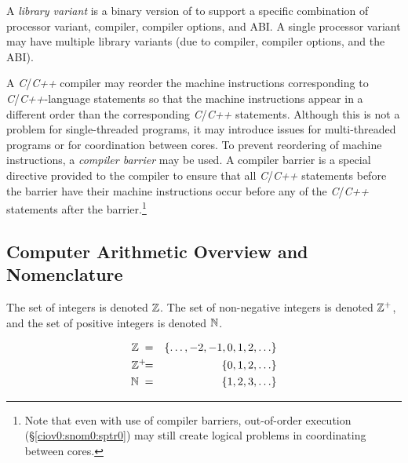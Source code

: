 A \emph{library variant} is a binary 
version of \emph{\productbasenameshort{}} to support a 
specific combination of processor variant, compiler, 
compiler options, and ABI\@.  A single processor variant may 
have multiple library variants (due to compiler, compiler 
options, and the ABI).  

A \emph{C}/\emph{C++} compiler may reorder the machine 
instructions corresponding to \emph{C}/\emph{C++}-language 
statements so that the machine instructions appear in a 
different order than the corresponding \emph{C}/\emph{C++} 
statements.  Although this is not a problem for 
single-threaded programs, it may introduce issues for 
multi-threaded programs or for coordination between cores.  
To prevent reordering of machine instructions, a 
\emph{compiler barrier} may be used.  
A compiler barrier is a special directive provided to the 
compiler to ensure that all \emph{C}/\emph{C++} statements 
before the barrier have their machine instructions occur 
before any of the \emph{C}/\emph{C++} statements after the 
barrier.\footnote{Note that even with use of compiler 
barriers, out-of-order execution 
(\S{}\ref{ciov0:snom0:sptr0}) may still create logical 
problems in coordinating between cores.} 



\subsection{Computer Arithmetic Overview and Nomenclature}
\label{cldd0:snom0:scan0}

The set of integers is denoted 
${\mathbb{Z}}{}$\@.  The set of 
non-negative integers is denoted 
${\mathbb{Z}^+}{}$, and 
the set of positive integers is denoted 
${\mathbb{N}}{}$.  

\begin{eqnarray}
\label{eq:ciov0:snom0:scan0:01}
{\mathbb{Z}}{}   \;    & = & \{ \ldots , -2, -1, 0, 1, 2, \ldots \} \\
\label{eq:ciov0:snom0:scan0:02}
{\mathbb{Z}^+}{} \!\!\!\!\; & = & \{ 0, 1, 2, \ldots \}         \\
\label{eq:ciov0:snom0:scan0:03}
{\mathbb{N}}{}  \;  & = & \{ 1, 2, 3, \ldots \}
\end{eqnarray}


